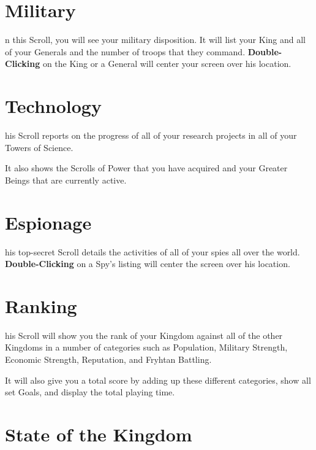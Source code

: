 \section{Military}


n this Scroll, you will see your military disposition. It will list your King and all of your Generals and the number of troops that they command. \textbf{Double-Clicking} on the King or a General will center your screen over his location.

\section{Technology}


his Scroll reports on the progress of all of your research projects in all of your Towers of Science.

It also shows the Scrolls of Power that you have acquired and your Greater Beings that are currently active.

\section{Espionage}



his top-secret Scroll details the activities of all of your spies all over the world. \textbf{Double-Clicking} on a Spy’s listing will center the screen over his location.

\section{Ranking}


his Scroll will show you the rank of your Kingdom against all of the other Kingdoms in a number of categories such as Population, Military Strength, Economic Strength, Reputation, and Fryhtan Battling.

It will also give you a total score by adding up these different categories, show all set Goals, and display the total playing time.

\section{State of the Kingdom}

